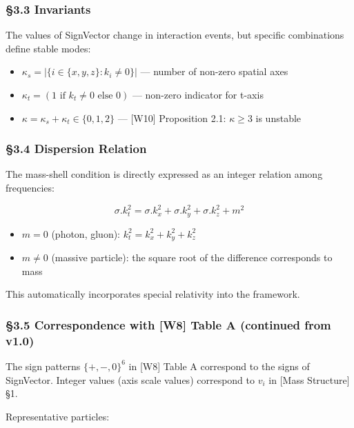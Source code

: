 \documentclass[a4paper,11pt]{article}
\providecommand{\tightlist}{\setlength{\itemsep}{0pt}\setlength{\parskip}{0pt}}
\begin{document}
\subsubsection{§3.3 Invariants}\label{invariants}

The values of SignVector change in interaction events, but specific
combinations define stable modes:

\begin{itemize}
\tightlist
\item
  \(\kappa_s = |\{i \in \{x,y,z\} : k_i \neq 0\}|\) --- number of
  non-zero spatial axes
\item
  \(\kappa_t = (1 \text{ if } k_t \neq 0 \text{ else } 0)\) --- non-zero
  indicator for t-axis
\item
  \(\kappa = \kappa_s + \kappa_t \in \{0, 1, 2\}\) --- {[}W10{]}
  Proposition 2.1: \(\kappa \geq 3\) is unstable
\end{itemize}

\subsubsection{§3.4 Dispersion Relation}\label{dispersion-relation}

The mass-shell condition is directly expressed as an integer relation
among frequencies:

\[\sigma.k_t^2 = \sigma.k_x^2 + \sigma.k_y^2 + \sigma.k_z^2 + m^2\]

\begin{itemize}
\tightlist
\item
  \(m = 0\) (photon, gluon): \(k_t^2 = k_x^2 + k_y^2 + k_z^2\)
\item
  \(m \neq 0\) (massive particle): the square root of the difference
  corresponds to mass
\end{itemize}

This automatically incorporates special relativity into the framework.

\subsubsection{§3.5 Correspondence with {[}W8{]} Table A (continued from
v1.0)}\label{correspondence-with-w8-table-a-continued-from-v1.0}

The sign patterns \(\{+, -, 0\}^6\) in {[}W8{]} Table A correspond to
the signs of SignVector. Integer values (axis scale values) correspond
to \(v_i\) in {[}Mass Structure{]} §1.

Representative particles:
\end{document}
